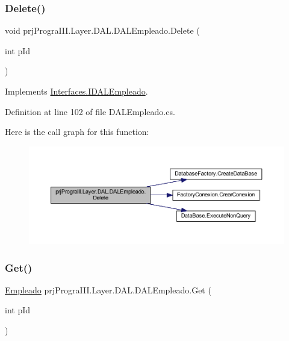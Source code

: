 \subsubsection{\texorpdfstring{Delete()}{Delete()}}
{\footnotesize\ttfamily void prj\+Progra\+I\+I\+I.\+Layer.\+D\+A\+L.\+D\+A\+L\+Empleado.\+Delete (\begin{DoxyParamCaption}\item[{int}]{p\+Id }\end{DoxyParamCaption})}



Implements \hyperlink{interface_interfaces_1_1_i_d_a_l_empleado_a0e852e403321a652e418e8e09a94981d}{Interfaces.\+I\+D\+A\+L\+Empleado}.



Definition at line 102 of file D\+A\+L\+Empleado.\+cs.

Here is the call graph for this function\+:
\nopagebreak
\begin{figure}[H]
\begin{center}
\leavevmode
\includegraphics[width=350pt]{classprj_progra_i_i_i_1_1_layer_1_1_d_a_l_1_1_d_a_l_empleado_a85ce6a93aea851d43025d0ff443d7c3d_cgraph}
\end{center}
\end{figure}
\hypertarget{classprj_progra_i_i_i_1_1_layer_1_1_d_a_l_1_1_d_a_l_empleado_a0f1fb578c7f7284e5bdd88be66eb8641}{}\label{classprj_progra_i_i_i_1_1_layer_1_1_d_a_l_1_1_d_a_l_empleado_a0f1fb578c7f7284e5bdd88be66eb8641} 
\subsubsection{\texorpdfstring{Get()}{Get()}}
{\footnotesize\ttfamily \hyperlink{classprj_progra_i_i_i_1_1_layer_1_1_entities_1_1_empleado}{Empleado} prj\+Progra\+I\+I\+I.\+Layer.\+D\+A\+L.\+D\+A\+L\+Empleado.\+Get (\begin{DoxyParamCaption}\item[{int}]{p\+Id }\end{DoxyParamCaption})}



